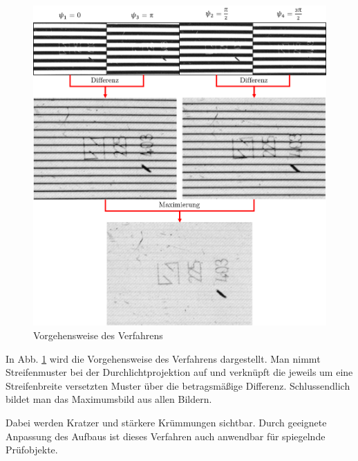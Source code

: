 \documentclass[ngerman,11pt,twocolumn,a4paper]{article}
\begin{document}
	\begin{figure}[H]
		\centering
		\includegraphics[width=\columnwidth]{imageTree}
		\caption{Vorgehensweise des Verfahrens}
		\label{img:imageTree}
	\end{figure}
	
	In Abb. \ref{img:imageTree} wird die Vorgehensweise des Verfahrens dargestellt.
	Man nimmt Streifenmuster bei der Durchlichtprojektion auf und verknüpft die jeweils um eine Streifenbreite versetzten Muster über die betragsmäßige Differenz.
	Schlussendlich bildet man das Maximumsbild aus allen Bildern.
	
	\par
	Dabei werden Kratzer und stärkere Krümmungen sichtbar.
	Durch geeignete Anpassung des Aufbaus ist dieses Verfahren auch anwendbar für spiegelnde Prüfobjekte.
	
\end{document}
